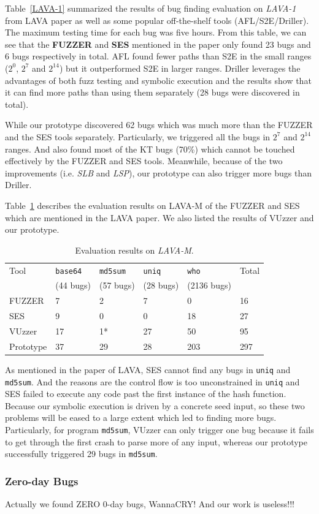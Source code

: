 Table~\ref{LAVA-1} summarized the results of bug finding evaluation on \textit{LAVA-1} from LAVA paper as well as some popular off-the-shelf tools (AFL/S2E/Driller). The maximum testing time for each bug was five hours. From this table, we can see that the \textbf{FUZZER} and \textbf{SES} mentioned in the paper only found 23 bugs and 6 bugs respectively in total. AFL found fewer paths than S2E in the small ranges ($2^0$, $2^7$ and $2^{14}$) but it outperformed S2E in larger ranges. Driller leverages the advantages of both fuzz testing and symbolic execution and the results show that it can find more paths than using them separately (28 bugs were discovered in total).

While our prototype discovered 62 bugs which was much more than the FUZZER and the SES tools separately. Particularly, we triggered all the bugs in $2^7$ and $2^{14}$ ranges. And also found most of the KT bugs (70\%) which cannot be touched effectively by the FUZZER and SES tools. Meanwhile, because of the two improvements (i.e. \textit{SLB} and \textit{LSP}), our prototype can also trigger more bugs than Driller.

Table~\ref{LAVA-M} describes the evaluation results on LAVA-M of the FUZZER and SES which are mentioned in the LAVA paper. We also listed the results of VUzzer and our prototype. 

\begin{table}
  \caption{\label{LAVA-M}Evaluation results on \textit{LAVA-M}.}
  \centering
	\begin{tabular}{p{2cm}<{\centering} p{1.5cm}<{\centering} p{1.5cm}<{\centering}  p{1.5cm}<{\centering} p{1.8cm}<{\centering}  p{1.5cm}<{\centering} }
		\toprule
	    Tool & \texttt{base64} & \texttt{md5sum} & \texttt{uniq} & \texttt{who} & Total  \\
	         & (44 bugs) & (57 bugs) & (28 bugs) & (2136 bugs) &  \\
		\midrule
		FUZZER 		& 7  & 2  & 7    & 0   & 16  \\
		SES	        & 9  & 0  & 0    & 18  & 27  \\
		VUzzer		& 17 & 1* & 27   & 50  & 95 \\
		Prototype	& 37 & 29 & 28   & 203 & 297 \\
	 \bottomrule
	\end{tabular}
\end{table}

As mentioned in the paper of LAVA, SES cannot find any bugs in \texttt{uniq} and \texttt{md5sum}. And the reasons are the control flow is too unconstrained in \texttt{uniq} and SES failed to execute any code past the first instance of the hash function. Because our symbolic execution is driven by a concrete seed input, so these two problems will be eased to a large extent which led to finding more bugs. Particularly, for program \texttt{md5sum}, VUzzer can only trigger one bug because it fails to get through the first crash to parse more of any input, whereas our prototype successfully triggered 29 bugs in \texttt{md5sum}.

\subsubsection{Zero-day Bugs}
Actually we found ZERO 0-day bugs, WannaCRY! And our work is useless!!!

